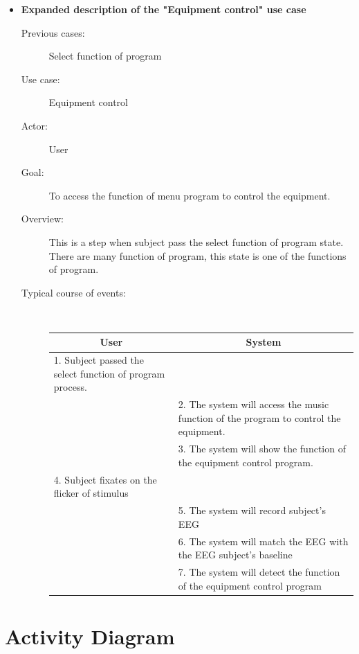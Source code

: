 \begin{itemize}
\begin{description}
\end{description}

\newpage
\item \textbf{Expanded description of the "Equipment control" use case }
\begin{description}
	\item [Previous cases:] Select function of program
	\item [Use case:] Equipment control
	\item [Actor:] User  
	\item [Goal:] To access the function of menu program to control the equipment. 
	\item [Overview:] This is a step when subject pass the select function of program state. There are many function of program, this state is one of the functions of program. 
	\item [Typical course of events:]~
	
	{
		\centering
		\begin{tabular}{| m{.47\linewidth} | m{.47\linewidth} |}
			
			\hline 
			\multicolumn{1}{|c}{\textbf{User}} & 
  			\multicolumn{1}{|c|}{\textbf{System}}\\
			\hline 
			1. Subject passed the select function of program process. &   \\
			\hline 
			 & 2. The system will access the music function of the program to control the equipment.  \\
			\hline 
			& 3. The system will show the function of the equipment control program. \\
			\hline 
			4. Subject fixates on the flicker of stimulus &  \\
			\hline
			 & 5. The system will record subject's EEG \\
\hline
			& 6. The system will match the EEG with the EEG subject's baseline\\
			\hline
            & 7. The system will detect the function of the equipment control program\\
			\hline
		\end{tabular}
	}
	
\end{description}

\end{itemize}

\newpage
\section{Activity Diagram}


